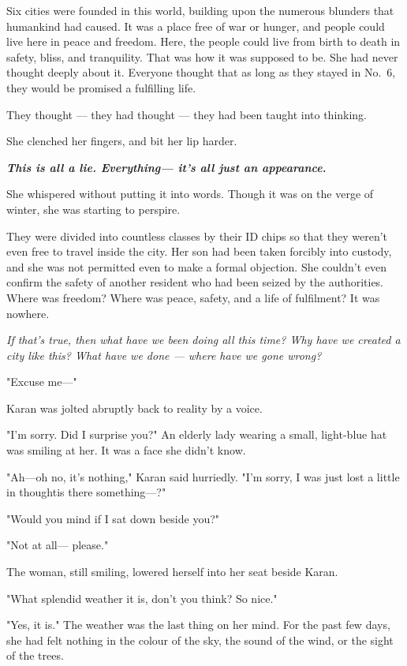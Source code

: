 Six cities were founded in this world, building upon the numerous
blunders that humankind had caused. It was a place free of war or
hunger, and people could live here in peace and freedom. Here, the
people could live from birth to death in safety, bliss, and tranquility.
That was how it was supposed to be. She had never thought deeply about
it. Everyone thought that as long as they stayed in No.~6, they would be
promised a fulfilling life.

They thought --- they had thought --- they had been taught into thinking.

She clenched her fingers, and bit her lip harder.

\textbf{\emph{This is all a lie. Everything--- it's all just an appearance.}}

She whispered without putting it into words. Though it was on the verge
of winter, she was starting to perspire.

They were divided into countless classes by their ID chips so that they
weren't even free to travel inside the city. Her son had been taken
forcibly into custody, and she was not permitted even to make a formal
objection. She couldn't even confirm the safety of another resident who
had been seized by the authorities. Where was freedom? Where was peace,
safety, and a life of fulfilment? It was nowhere.

\emph{If that's true, then what have we been doing all this time? Why have we
created a city like this? What have we done --- where have we gone wrong?}

"Excuse me---"

Karan was jolted abruptly back to reality by a voice.

"I'm sorry. Did I surprise you?" An elderly lady wearing a small,
light-blue hat was smiling at her. It was a face she didn't know.

"Ah---oh no, it's nothing," Karan said hurriedly. "I'm sorry, I was just
lost a little in thought\el is there something---?"

"Would you mind if I sat down beside you?"

"Not at all--- please."

The woman, still smiling, lowered herself into her seat beside Karan.

"What splendid weather it is, don't you think? So nice."

"Yes, it is." The weather was the last thing on her mind. For the past
few days, she had felt nothing in the colour of the sky, the sound of
the wind, or the sight of the trees.

